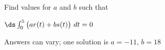 {Find values for $a$ and $b$ such that 

$\ds \int_0^5 \big(ar(t)+bs(t)\big) \ dt=0$
}
{Answers can vary; one solution is $a=-11$, $b=18$
}

